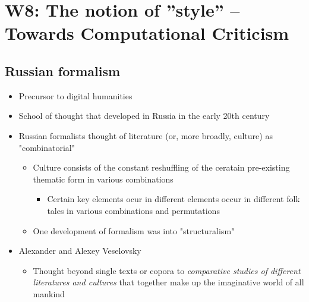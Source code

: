 \documentclass[a4paper]{article}
\begin{document}
\newpage
\section{W8: The notion of ”style” -- Towards Computational Criticism}

\subsection{Russian formalism}
\begin{itemize}
    \item Precursor to digital humanities
    \item School of thought that developed in Russia in the early 20th century
    \item Russian formalists thought of literature (or, more broadly, culture) as "combinatorial"
    \begin{itemize}[label=$\circ$]
        \item Culture consists of the constant reshuffling of the ceratain pre-existing thematic form in various combinations
        \begin{itemize}[label=\tiny$\blacksquare$]
            \item Certain key elements ocur in different elements occur in different folk tales in various combinations and permutations
        \end{itemize}
        \item One development of formalism was into "structuralism"
    \end{itemize}
    \item Alexander and Alexey Veselovsky
    \begin{itemize}[label=$\circ$]
        \item Thought beyond single texts or copora to \textit{comparative studies of different literatures and cultures} that together make up the imaginative world of all mankind
    \end{itemize}
\end{itemize}
\end{document}
